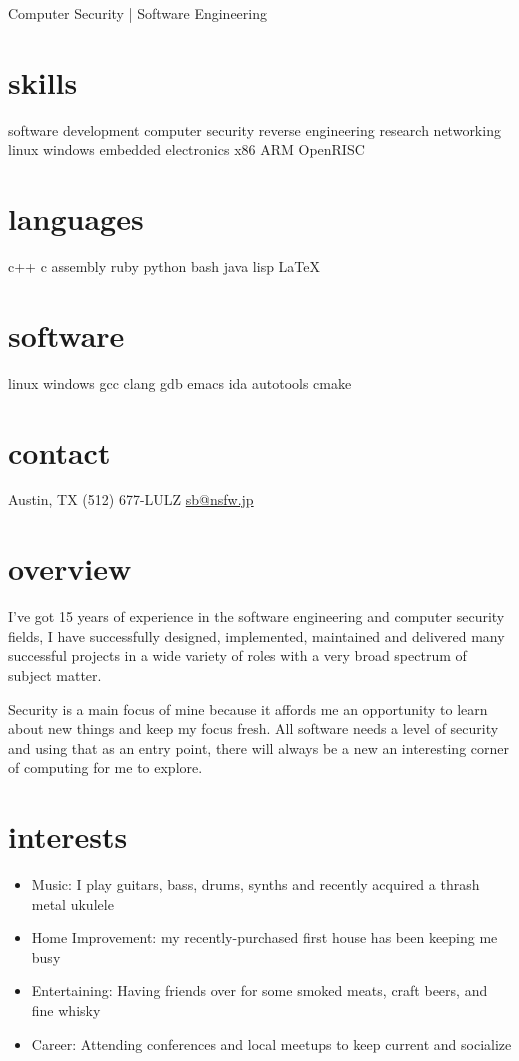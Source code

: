 \documentclass[]{friggeri-cv}
\begin{document}
       {Computer Security | Software Engineering}

\begin{aside}
  \section{skills}
  software development
  computer security
  reverse engineering
  research
  networking
  linux
  windows
  embedded
  electronics
  x86
  ARM
  OpenRISC
  \section{languages}
  c++
  c
  assembly
  ruby
  python
  bash
  java
  lisp
  \LaTeX
  \section{software}
  linux
  windows
  gcc
  clang
  gdb
  emacs
  ida
  autotools
  cmake
  \section{contact}
  Austin, TX
  (512) 677-LULZ
  \href{mailto:sb@nsfw.jp}{sb@nsfw.jp}
\end{aside}

\section{overview}

I've got 15 years of experience in the software engineering and
computer security fields, I have successfully designed, implemented,
maintained and delivered many successful projects in a wide variety of
roles with a very broad spectrum of subject matter.

Security is a main focus of mine because it affords me an opportunity
to learn about new things and keep my focus fresh. All software needs
a level of security and using that as an entry point, there will
always be a new an interesting corner of computing for me to explore.

\section{interests}

\begin{itemize}
\item{Music: I play guitars, bass, drums, synths and recently
  acquired a thrash metal ukulele}
\item{Home Improvement: my recently-purchased first house has been keeping me busy}
\item{Entertaining: Having friends over for some smoked meats, craft
  beers, and fine whisky}
\item{Career: Attending conferences and local meetups to keep current
  and socialize}
\end{itemize}
\end{document}
